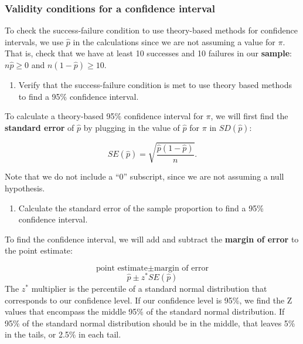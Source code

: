 \documentclass[
]{report}
\providecommand{\tightlist}{%
  \setlength{\itemsep}{0pt}\setlength{\parskip}{0pt}}
\begin{document}
\hypertarget{validity-conditions-for-a-confidence-interval}{%
\subsubsection*{Validity conditions for a confidence interval}\label{validity-conditions-for-a-confidence-interval}}

To check the success-failure condition to use theory-based methods for confidence intervals, we use \(\hat{p}\) in the calculations since we are not assuming a value for \(\pi\). That is, check that we have at least 10 successes and 10 failures in our \textbf{sample}: \(n\hat{p} \geq 0\) and \(n(1-\hat{p}) \geq 10\).

\begin{enumerate}
\def\labelenumi{\arabic{enumi}.}
\setcounter{enumi}{12}
\tightlist
\item
  Verify that the success-failure condition is met to use theory based methods to find a 95\% confidence interval.
\end{enumerate}

\vspace{0.5in}
\newpage

To calculate a theory-based 95\% confidence interval for \(\pi\), we will first find the \textbf{standard error} of \(\hat{p}\) by plugging in the value of \(\hat{p}\) for \(\pi\) in \(SD(\hat{p})\):

\[SE(\hat{p}) = \sqrt{\frac{\hat{p}(1-\hat{p})}{n}}.\]

Note that we do not include a ``0'' subscript, since we are not assuming a null hypothesis.

\begin{enumerate}
\def\labelenumi{\arabic{enumi}.}
\setcounter{enumi}{13}
\tightlist
\item
  Calculate the standard error of the sample proportion to find a 95\% confidence interval.
\end{enumerate}

\vspace{0.5in}

To find the confidence interval, we will add and subtract the \textbf{margin of error} to the point estimate:

\[\text{point estimate}\pm\text{margin of error}\]
\[\hat{p}\pm z^* SE(\hat{p})\]
The \(z^*\) multiplier is the percentile of a standard normal distribution that corresponds to our confidence level. If our confidence level is 95\%, we find the Z values that encompass the middle 95\% of the standard normal distribution. If 95\% of the standard normal distribution should be in the middle, that leaves 5\% in the tails, or 2.5\% in each tail.
\end{document}
